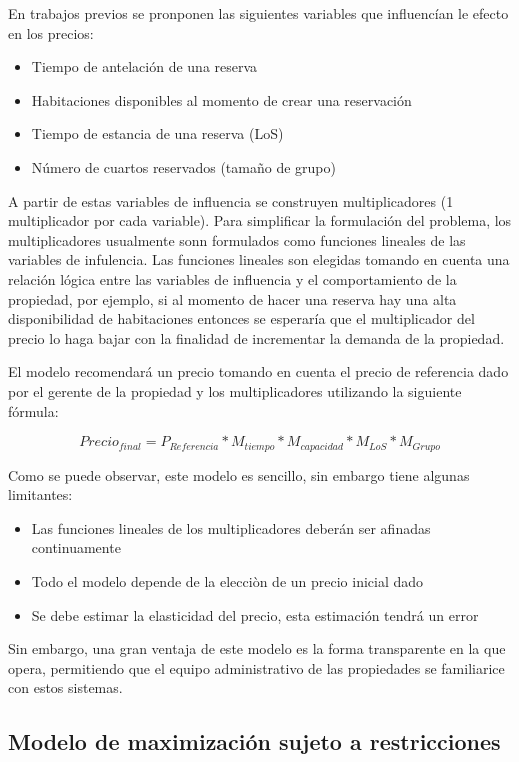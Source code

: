 {En trabajos previos se pronponen las siguientes variables que influencían le efecto en los precios:
\begin{itemize}
  \item Tiempo de antelación de una reserva
  \item Habitaciones disponibles al momento de crear una reservación
  \item Tiempo de estancia de una reserva (LoS)
  \item Número de cuartos reservados (tamaño de grupo)
\end{itemize}

A partir de estas variables de influencia se construyen multiplicadores (1 multiplicador por cada variable). Para simplificar la formulación del problema, los multiplicadores usualmente sonn formulados como funciones lineales de las variables de infulencia. Las funciones lineales son elegidas tomando en cuenta una relación lógica entre las variables de influencia y el comportamiento de la propiedad, por ejemplo, si al momento de hacer una reserva hay una alta disponibilidad de habitaciones entonces se esperaría que el multiplicador del precio lo haga bajar con la finalidad de incrementar la demanda de la propiedad.

El modelo recomendará un precio tomando en cuenta el precio de referencia dado por el gerente de la propiedad y los multiplicadores utilizando la siguiente fórmula:

$$Precio_{final} = P_{Referencia} * M_{tiempo} * M_{capacidad} * M_{LoS} * M_{Grupo}$$

Como se puede observar, este modelo es sencillo, sin embargo tiene algunas limitantes:
\begin{itemize}
  \item Las funciones lineales de los multiplicadores deberán ser afinadas continuamente
  \item Todo el modelo depende de la elecciòn de un precio inicial dado
  \item Se debe estimar la elasticidad del precio, esta estimación tendrá un error
\end{itemize}

Sin embargo, una gran ventaja de este modelo es la forma transparente en la que opera, permitiendo que el equipo administrativo de las propiedades se familiarice con estos sistemas.



\subsection*{Modelo de maximización sujeto a restricciones}

}
